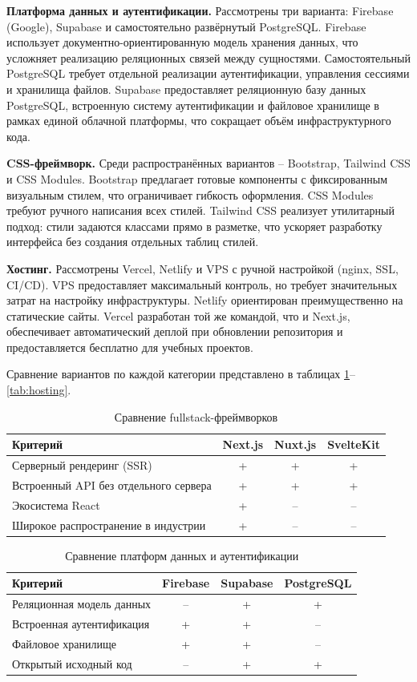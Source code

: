 \textbf{Платформа данных и аутентификации.} Рассмотрены три варианта: Firebase
(Google), Supabase и самостоятельно развёрнутый PostgreSQL. Firebase использует
документно-ориентированную модель хранения данных, что усложняет реализацию
реляционных связей между сущностями. Самостоятельный PostgreSQL требует отдельной
реализации аутентификации, управления сессиями и хранилища файлов. Supabase
предоставляет реляционную базу данных PostgreSQL, встроенную систему аутентификации
и файловое хранилище в рамках единой облачной платформы, что сокращает объём
инфраструктурного кода.

\textbf{CSS-фреймворк.} Среди распространённых вариантов -- Bootstrap, Tailwind CSS
и CSS Modules. Bootstrap предлагает готовые компоненты с фиксированным визуальным
стилем, что ограничивает гибкость оформления. CSS Modules требуют ручного написания
всех стилей. Tailwind CSS реализует утилитарный подход: стили задаются классами
прямо в разметке, что ускоряет разработку интерфейса без создания отдельных
таблиц стилей.

\textbf{Хостинг.} Рассмотрены Vercel, Netlify и VPS с ручной настройкой (nginx,
SSL, CI/CD). VPS предоставляет максимальный контроль, но требует значительных
затрат на настройку инфраструктуры. Netlify ориентирован преимущественно на
статические сайты. Vercel разработан той же командой, что и Next.js, обеспечивает
автоматический деплой при обновлении репозитория и предоставляется бесплатно
для учебных проектов.

Сравнение вариантов по каждой категории представлено в таблицах
\ref{tab:fw}--\ref{tab:hosting}.

\begin{table}[h]
\centering
\caption{Сравнение fullstack-фреймворков}
\label{tab:fw}
\begin{tabular}{|p{5.5cm}|c|c|c|}
\hline
\textbf{Критерий} & \textbf{Next.js} & \textbf{Nuxt.js} & \textbf{SvelteKit} \\
\hline
Серверный рендеринг (SSR) & + & + & + \\
\hline
Встроенный API без отдельного сервера & + & + & + \\
\hline
Экосистема React & + & -- & -- \\
\hline
Широкое распространение в индустрии & + & -- & -- \\
\hline
\end{tabular}
\end{table}

\begin{table}[h]
\centering
\caption{Сравнение платформ данных и аутентификации}
\label{tab:db}
\begin{tabular}{|p{5.5cm}|c|c|c|}
\hline
\textbf{Критерий} & \textbf{Firebase} & \textbf{Supabase} & \textbf{PostgreSQL} \\
\hline
Реляционная модель данных & -- & + & + \\
\hline
Встроенная аутентификация & + & + & -- \\
\hline
Файловое хранилище & + & + & -- \\
\hline
Открытый исходный код & -- & + & + \\
\hline
\end{tabular}
\end{table}

